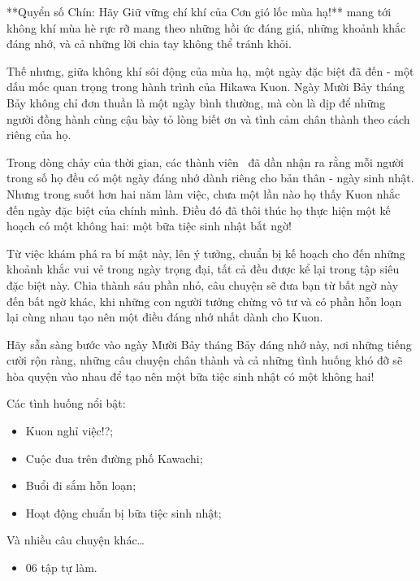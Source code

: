 \documentclass[main.tex]{subfiles}
\begin{document}
**Quyển số Chín: Hãy Giữ vững chí khí của Cơn gió lốc mùa hạ!** mang tới không khí mùa hè rực rỡ mang theo những hồi ức đáng giá, những khoảnh khắc đáng nhớ, và cả những lời chia tay không thể tránh khỏi.

Thế nhưng, giữa không khí sôi động của mùa hạ, một ngày đặc biệt đã đến - một dấu mốc quan trọng trong hành trình của Hikawa Kuon. Ngày Mười Bảy tháng Bảy không chỉ đơn thuần là một ngày bình thường, mà còn là dịp để những người đồng hành cùng cậu bày tỏ lòng biết ơn và tình cảm chân thành theo cách riêng của họ.

Trong dòng chảy của thời gian, các thành viên \hll\ đã dần nhận ra rằng mỗi người trong số họ đều có một ngày đáng nhớ dành riêng cho bản thân - ngày sinh nhật. Nhưng trong suốt hơn hai năm làm việc, chưa một lần nào họ thấy Kuon nhắc đến ngày đặc biệt của chính mình. Điều đó đã thôi thúc họ thực hiện một kế hoạch có một không hai: một bữa tiệc sinh nhật bất ngờ!

Từ việc khám phá ra bí mật này, lên ý tưởng, chuẩn bị kế hoạch cho đến những khoảnh khắc vui vẻ trong ngày trọng đại, tất cả đều được kể lại trong tập siêu đặc biệt này. Chia thành sáu phần nhỏ, câu chuyện sẽ đưa bạn từ bất ngờ này đến bất ngờ khác, khi những con người tưởng chừng vô tư và có phần hỗn loạn lại cùng nhau tạo nên một điều đáng nhớ nhất dành cho Kuon.

Hãy sẵn sàng bước vào ngày Mười Bảy tháng Bảy đáng nhớ này, nơi những tiếng cười rộn ràng, những câu chuyện chân thành và cả những tình huống khó đỡ sẽ hòa quyện vào nhau để tạo nên một bữa tiệc sinh nhật có một không hai!

Các tình huống nổi bật:
\begin{itemize}
    \item Kuon nghỉ việc!?;
    \item Cuộc đua trên đường phố Kawachi;
    \item Buổi đi sắm hỗn loạn;
    \item Hoạt động chuẩn bị bữa tiệc sinh nhật;
\end{itemize}
Và nhiều câu chuyện khác\dots

{}
\begin{itemize}
\item 06 tập tự làm.
\end{itemize}
\end{document}
